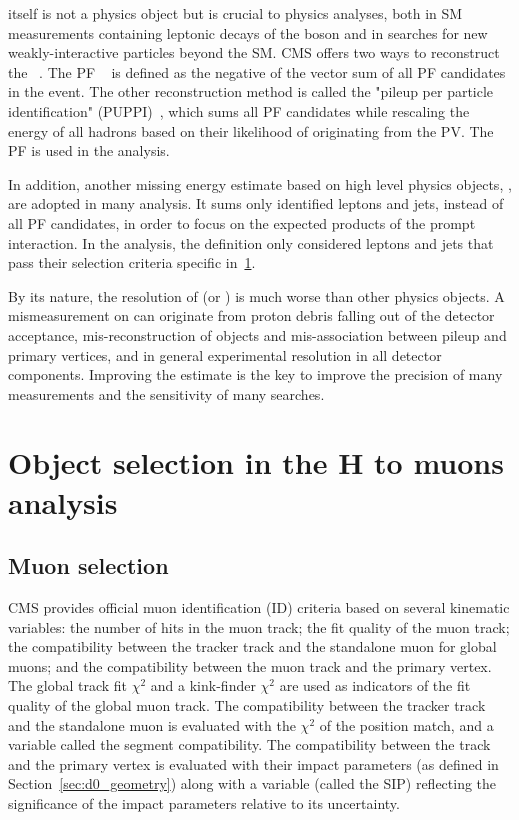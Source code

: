\MET itself is not a physics object but is crucial to physics analyses, 
both in SM measurements containing leptonic decays of the \PW boson
and in searches for new weakly-interactive particles beyond the SM.
CMS offers two ways to reconstruct the \MET~\cite{Sirunyan_2019}.
The PF \MET~\cite{collaboration_2015} is defined as the negative of the vector \pt sum of all PF candidates in the event.
The other reconstruction method is called the "pileup per particle identification" (PUPPI)~\cite{Bertolini2014},
which sums all PF candidates while rescaling the energy of all hadrons based on their likelihood of originating from the PV.
The PF \MET is used in the \hmm analysis.

In addition, another missing energy estimate based on high level physics objects, \MHT, are adopted in many analysis.
It sums only identified leptons and jets, instead of all PF candidates, 
in order to focus on the expected products of the prompt interaction.
In the \hmm analysis, the \MHT definition only considered leptons and jets that pass their selection criteria specific in~\ref{sec:obj_sel}. 

By its nature, the resolution of \MET (or \MHT) is much worse than other physics objects.
A mismeasurement on \MET can originate from proton debris falling out of the detector acceptance,
mis-reconstruction of objects and mis-association between pileup and primary vertices,
and in general experimental resolution in all detector components.
Improving the \MET estimate is the key to improve the precision of many measurements and the sensitivity of many searches.


\section{Object selection in the H to muons analysis}\label{sec:obj_sel}

\subsection{Muon selection}\label{sec:sel_muon}

CMS provides official muon identification (ID) criteria based on several kinematic variables:
the number of hits in the muon track; the fit quality of the muon track; 
the compatibility between the tracker track and the standalone muon for global muons;
and the compatibility between the muon track and the primary vertex.
The global track fit $\chi^{2}$ and a kink-finder $\chi^{2}$ are used as indicators of the fit quality of the global muon track.
The compatibility between the tracker track and the standalone muon is evaluated with the $\chi^{2}$ of the position match, 
and a variable called the segment compatibility.
The compatibility between the track and the primary vertex is evaluated with their impact parameters (as defined in Section~\ref{sec:d0_geometry})
along with a variable (called the SIP) reflecting the significance of the impact parameters relative to its uncertainty.

